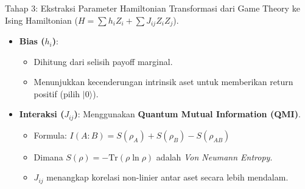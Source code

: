 \documentclass{beamer}
\begin{document}
\begin{frame}{Tahap 3: Ekstraksi Parameter Hamiltonian}
    Transformasi dari Game Theory ke Ising Hamiltonian ($H = \sum h_i Z_i + \sum J_{ij} Z_i Z_j$).
    
    \begin{itemize}
        \item \textbf{Bias ($h_i$)}:
        \begin{itemize}
            \item Dihitung dari selisih payoff marginal.
            \item Menunjukkan kecenderungan intrinsik aset untuk memberikan return positif (pilih $|0\rangle$).
        \end{itemize}
        \item \textbf{Interaksi ($J_{ij}$)}: Menggunakan \textbf{Quantum Mutual Information (QMI)}.
        \begin{itemize}
            \item Formula: $I(A:B) = S(\rho_A) + S(\rho_B) - S(\rho_{AB})$
            \item Dimana $S(\rho) = -\text{Tr}(\rho \ln \rho)$ adalah \textit{Von Neumann Entropy}.
            \item $J_{ij}$ menangkap korelasi non-linier antar aset secara lebih mendalam.
        \end{itemize}
    \end{itemize}
\end{frame}
\end{document}
